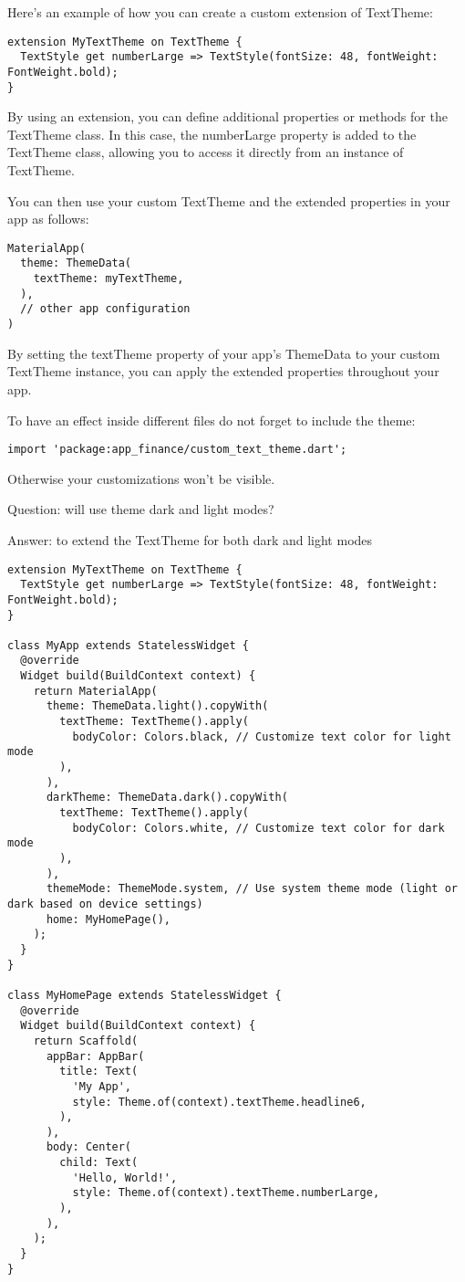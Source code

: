 Here's an example of how you can create a custom extension of TextTheme:

\begin{lstlisting}
extension MyTextTheme on TextTheme {
  TextStyle get numberLarge => TextStyle(fontSize: 48, fontWeight: FontWeight.bold);
}
\end{lstlisting}

By using an extension, you can define additional properties or methods for the TextTheme class. In this case, 
the numberLarge property is added to the TextTheme class, allowing you to access it directly from an instance of 
TextTheme.

You can then use your custom TextTheme and the extended properties in your app as follows:

\begin{lstlisting}
MaterialApp(
  theme: ThemeData(
    textTheme: myTextTheme,
  ),
  // other app configuration
)
\end{lstlisting}

By setting the textTheme property of your app's ThemeData to your custom TextTheme instance, you can apply the 
extended properties throughout your app.

To have an effect inside different files do not forget to include the theme:
\begin{lstlisting}
import 'package:app_finance/custom_text_theme.dart';
\end{lstlisting}

Otherwise your customizations won't be visible.


Question: will use theme dark and light modes?

Answer: to extend the TextTheme for both dark and light modes

\begin{lstlisting}
extension MyTextTheme on TextTheme {
  TextStyle get numberLarge => TextStyle(fontSize: 48, fontWeight: FontWeight.bold);
}

class MyApp extends StatelessWidget {
  @override
  Widget build(BuildContext context) {
    return MaterialApp(
      theme: ThemeData.light().copyWith(
        textTheme: TextTheme().apply(
          bodyColor: Colors.black, // Customize text color for light mode
        ),
      ),
      darkTheme: ThemeData.dark().copyWith(
        textTheme: TextTheme().apply(
          bodyColor: Colors.white, // Customize text color for dark mode
        ),
      ),
      themeMode: ThemeMode.system, // Use system theme mode (light or dark based on device settings)
      home: MyHomePage(),
    );
  }
}

class MyHomePage extends StatelessWidget {
  @override
  Widget build(BuildContext context) {
    return Scaffold(
      appBar: AppBar(
        title: Text(
          'My App',
          style: Theme.of(context).textTheme.headline6,
        ),
      ),
      body: Center(
        child: Text(
          'Hello, World!',
          style: Theme.of(context).textTheme.numberLarge,
        ),
      ),
    );
  }
}
\end{lstlisting}

